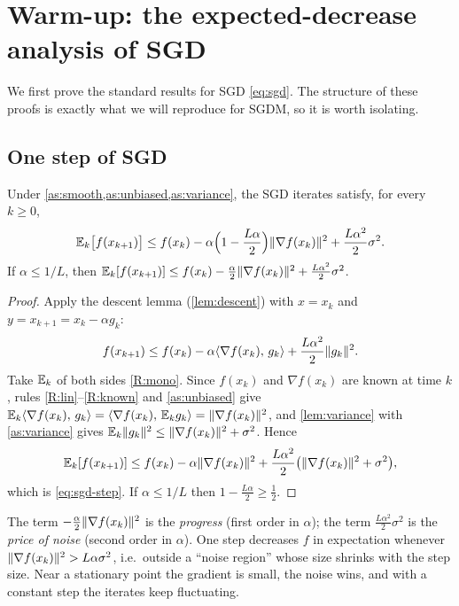 \section{Warm-up: the expected-decrease analysis of SGD}\label{sec:sgd}

We first prove the standard results for SGD \eqref{eq:sgd}. The structure of these proofs
is exactly what we will reproduce for SGDM, so it is worth isolating.

\subsection{One step of SGD}

\begin{lemma}\label{lem:sgd-step}
Under \cref{as:smooth,as:unbiased,as:variance}, the SGD iterates satisfy, for every $k\ge0$,
\begin{equation}\label{eq:sgd-step}
  \mathbb{E}_k\bigl[f(x_{k+1})\bigr]\le f(x_k)-\alpha\Bigl(1-\frac{L\alpha}2\Bigr)\lVert \nabla f(x_k)\rVert^2
  +\frac{L\alpha^2}{2}\sigma^2 .
\end{equation}
If $\alpha\le1/L$, then $\mathbb{E}_k[f(x_{k+1})]\le f(x_k)-\frac\alpha2\lVert \nabla f(x_k)\rVert^2
+\frac{L\alpha^2}{2}\sigma^2$.
\end{lemma}

\begin{proof}
Apply the descent lemma (\cref{lem:descent}) with $x=x_k$ and $y=x_{k+1}=x_k-\alpha g_k$:
\[
  f(x_{k+1})\le f(x_k)-\alpha\langle \nabla f(x_k),\, g_k\rangle+\frac{L\alpha^2}{2}\lVert g_k\rVert^2 .
\]
Take $\mathbb{E}_k$ of both sides \ref{R:mono}. Since $f(x_k)$ and $\nabla f(x_k)$ are known at
time $k$, rules \ref{R:lin}--\ref{R:known} and \cref{as:unbiased} give
$\mathbb{E}_k\langle \nabla f(x_k),\, g_k\rangle=\langle \nabla f(x_k),\, \mathbb{E}_k g_k\rangle=\lVert \nabla f(x_k)\rVert^2$, and
\cref{lem:variance} with \cref{as:variance} gives
$\mathbb{E}_k\lVert g_k\rVert^2\le\lVert \nabla f(x_k)\rVert^2+\sigma^2$. Hence
\[
  \mathbb{E}_k[f(x_{k+1})]\le f(x_k)-\alpha\lVert \nabla f(x_k)\rVert^2
  +\frac{L\alpha^2}{2}\bigl(\lVert \nabla f(x_k)\rVert^2+\sigma^2\bigr),
\]
which is \eqref{eq:sgd-step}. If $\alpha\le1/L$ then $1-\frac{L\alpha}2\ge\frac12$.
\end{proof}

\begin{tcolorbox}[intuition,title=Reading the inequality]
The term $-\frac\alpha2\lVert \nabla f(x_k)\rVert^2$ is the \emph{progress} (first order in
$\alpha$); the term $\frac{L\alpha^2}{2}\sigma^2$ is the \emph{price of noise} (second
order in $\alpha$). One step decreases $f$ in expectation whenever
$\lVert \nabla f(x_k)\rVert^2>L\alpha\sigma^2$, i.e.\ outside a ``noise region'' whose size
shrinks with the step size. Near a stationary point the gradient is small, the noise wins,
and with a constant step the iterates keep fluctuating.
\end{tcolorbox}

